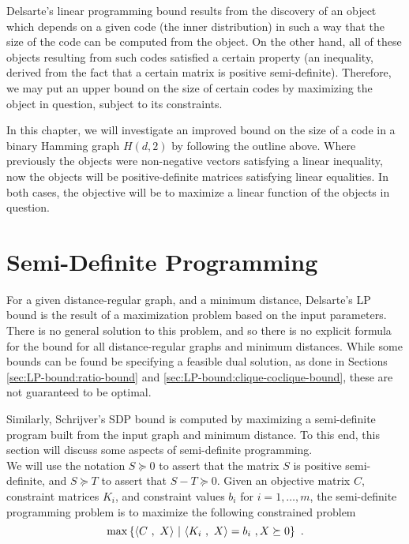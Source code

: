 \documentclass{report}
\begin{document}
  Delsarte's linear programming bound results from the discovery of an object
  which depends on a given code (the inner distribution) in such a way that the
  size of the code can be computed from the object.  On the other hand, all of
  these objects resulting from such codes satisfied a certain property (an
  inequality, derived from the fact that a certain matrix is positive
  semi-definite).  Therefore, we may put an upper bound on the size of certain
  codes by maximizing the object in question, subject to its constraints.

  In this chapter, we will investigate an improved bound on the size of a code
  in a binary Hamming graph $H(d, 2)$ by following the outline above.  Where
  previously the objects were non-negative vectors satisfying a linear
  inequality, now the objects will be positive-definite matrices satisfying
  linear equalities.  In both cases, the objective will be to maximize a linear
  function of the objects in question.

  \section{Semi-Definite Programming}\label{sec:SDP-bound:SDP}

    For a given distance-regular graph, and a minimum distance, Delsarte's LP
    bound is the result of a maximization problem based on the input parameters.
    There is no general solution to this problem, and so there is no explicit
    formula for the bound for all distance-regular graphs and minimum distances.
    While some bounds can be found be specifying a feasible dual solution, as
    done in Sections \ref{sec:LP-bound:ratio-bound} and
    \ref{sec:LP-bound:clique-coclique-bound}, these are not guaranteed to be
    optimal.

    Similarly, Schrijver's SDP bound is computed by maximizing a semi-definite
    program built from the input graph and minimum distance.  To this end, this
    section will discuss some aspects of semi-definite programming.
    \\

    We will use the notation $S \succeq 0$ to assert that the matrix $S$ is
    positive semi-definite, and $S \succeq T$ to assert that $S - T \succeq 0$.
    Given an objective matrix $C$, constraint matrices $K_i$, and constraint
    values $b_i$ for $i = 1, \ldots, m$, the semi-definite programming problem
    is to maximize the following constrained problem
    $$
      \max\left\lbrace  \left\langle  C \ , \ X  \right\rangle \ \middle| \ 
        \left\langle  K_i \ , \ X  \right\rangle = b_i \ ,
        X \succeq 0
        \right\rbrace \ .
    $$
\end{document}
